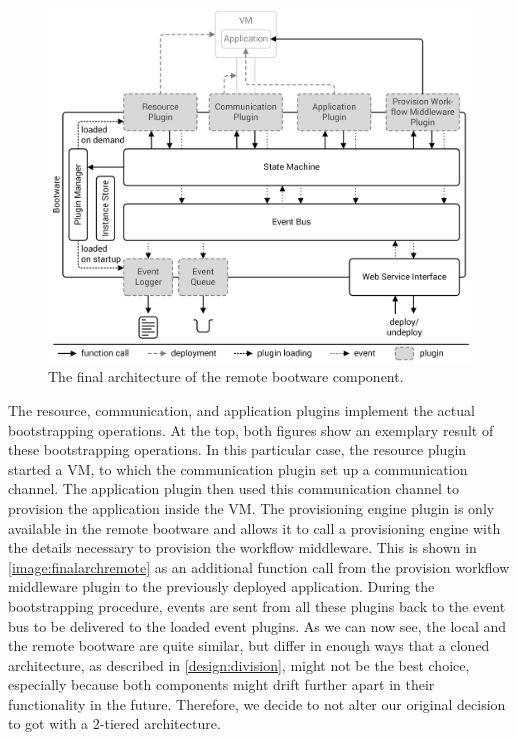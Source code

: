 \begin{figure}[!htbp]
	\centering
	\includegraphics[resolution=600]{design/assets/final_architecture_remote}
	\caption{The final architecture of the remote bootware component.}
	\label{image:finalarchremote}
\end{figure}

The resource, communication, and application plugins implement the actual bootstrapping operations.
At the top, both figures show an exemplary result of these bootstrapping operations.
In this particular case, the resource plugin started a VM, to which the communication plugin set up a communication channel.
The application plugin then used this communication channel to provision the application inside the VM.
The provisioning engine plugin is only available in the remote bootware and allows it to call a provisioning engine with the details necessary to provision the workflow middleware.
This is shown in \autoref{image:finalarchremote} as an additional function call from the provision workflow middleware plugin to the previously deployed application.
During the bootstrapping procedure, events are sent from all these plugins back to the event bus to be delivered to the loaded event plugins.
As we can now see, the local and the remote bootware are quite similar, but differ in enough ways that a cloned architecture, as described in \autoref{design:division}, might not be the best choice, especially because both components might drift further apart in their functionality in the future.
Therefore, we decide to not alter our original decision to got with a 2-tiered architecture.
